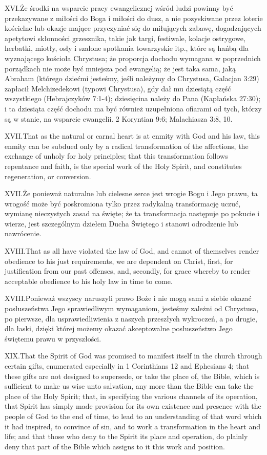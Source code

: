 \lettrine{XVI.} Że środki na wsparcie pracy ewangelicznej wśród ludzi powinny być przekazywane z miłości do Boga i miłości do dusz, a nie pozyskiwane przez loterie kościelne lub okazje mające przyczyniać się do miłujących zabawę, dogadzających apetytowi skłonności grzesznika, takie jak targi, festiwale, kolacje ostrygowe, herbatki, miotły, osły i szalone spotkania towarzyskie itp., które są hańbą dla wyznającego kościoła Chrystusa; że proporcja dochodu wymagana w poprzednich porządkach nie może być mniejsza pod ewangelią; że jest taka sama, jaką Abraham (którego dziećmi jesteśmy, jeśli należymy do Chrystusa, Galacjan 3:29) zapłacił Melchizedekowi (typowi Chrystusa), gdy dał mu dziesiątą część wszystkiego (Hebrajczyków 7:1-4); dziesięcina należy do Pana (Kapłańska 27:30); i ta dziesiąta część dochodu ma być również uzupełniona ofiarami od tych, którzy są w stanie, na wsparcie ewangelii. 2 Koryntian 9:6; Malachiasza 3:8, 10.


\lettrine{XVII.} That as the natural or carnal heart is at enmity with God and his law, this enmity can be subdued only by a radical transformation of the affections, the exchange of unholy for holy principles; that this transformation follows repentance and faith, is the special work of the Holy Spirit, and constitutes regeneration, or conversion.


\lettrine{XVII.} Że ponieważ naturalne lub cielesne serce jest wrogie Bogu i Jego prawu, ta wrogość może być poskromiona tylko przez radykalną transformację uczuć, wymianę nieczystych zasad na święte; że ta transformacja następuje po pokucie i wierze, jest szczególnym dziełem Ducha Świętego i stanowi odrodzenie lub nawrócenie.


\lettrine{XVIII.} That as all have violated the law of God, and cannot of themselves render obedience to his just requirements, we are dependent on Christ, first, for justification from our past offenses, and, secondly, for grace whereby to render acceptable obedience to his holy law in time to come.


\lettrine{XVIII.} Ponieważ wszyscy naruszyli prawo Boże i nie mogą sami z siebie okazać posłuszeństwa Jego sprawiedliwym wymaganiom, jesteśmy zależni od Chrystusa, po pierwsze, dla usprawiedliwienia z naszych przeszłych wykroczeń, a po drugie, dla łaski, dzięki której możemy okazać akceptowalne posłuszeństwo Jego świętemu prawu w przyszłości.


\lettrine{XIX.} That the Spirit of God was promised to manifest itself in the church through certain gifts, enumerated especially in 1 Corinthians 12 and Ephesians 4; that these gifts are not designed to supersede, or take the place of, the Bible, which is sufficient to make us wise unto salvation, any more than the Bible can take the place of the Holy Spirit; that, in specifying the various channels of its operation, that Spirit has simply made provision for its own existence and presence with the people of God to the end of time, to lead to an understanding of that word which it had inspired, to convince of sin, and to work a transformation in the heart and life; and that those who deny to the Spirit its place and operation, do plainly deny that part of the Bible which assigns to it this work and position.


